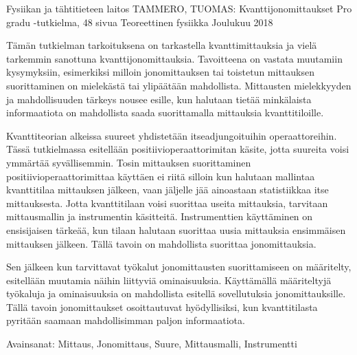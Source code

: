 \documentclass[a4paper,12pt]{wihuri}
\begin{document}
\begin{tiivistelma2}
        {Fysiikan ja tähtitieteen laitos}%
        {TAMMERO, TUOMAS:}%
        {Kvanttijonomittaukset}%
        {Pro gradu -tutkielma, 48 sivua}%
        {Teoreettinen fysiikka}%
        {Joulukuu 2018}%

Tämän tutkielman tarkoituksena on tarkastella kvanttimittauksia ja vielä tarkemmin sanottuna kvanttijonomittauksia. Tavoitteena on vastata muutamiin kysymyksiin, esimerkiksi milloin jonomittauksen tai toistetun mittauksen suorittaminen on mielekästä tai ylipäätään mahdollista. Mittausten mielekkyyden ja mahdollisuuden tärkeys nousee esille, kun halutaan tietää minkälaista informaatiota on mahdollista saada suorittamalla mittauksia kvanttitiloille.

Kvanttiteorian alkeissa suureet yhdistetään itseadjungoituihin operaattoreihin. Tässä tutkielmassa esitellään positiivioperaattorimitan käsite, jotta suureita voisi ymmärtää syvällisemmin. Tosin mittauksen suorittaminen positiivioperaattorimittaa käyttäen ei riitä silloin kun halutaan mallintaa kvanttitilaa mittauksen jälkeen, vaan jäljelle jää ainoastaan statistiikkaa itse mittauksesta. Jotta kvanttitilaan voisi suorittaa useita mittauksia, tarvitaan mittausmallin ja instrumentin käsitteitä. Instrumenttien käyttäminen on ensisijaisen tärkeää, kun tilaan halutaan suorittaa uusia mittauksia ensimmäisen mittauksen jälkeen. Tällä tavoin on mahdollista suorittaa jonomittauksia.

Sen jälkeen kun tarvittavat työkalut jonomittausten suorittamiseen on määritelty, esitellään muutamia näihin liittyviä ominaisuuksia. Käyttämällä määriteltyjä työkaluja ja ominaisuuksia on mahdollista esitellä sovellutuksia jonomittauksille. Tällä tavoin jonomittaukset osoittautuvat hyödyllisiksi, kun kvanttitilasta pyritään saamaan mahdollisimman paljon informaatiota.


\noindent Avainsanat: Mittaus, Jonomittaus, Suure, Mittausmalli, Instrumentti
\end{tiivistelma2}
\end{document}
